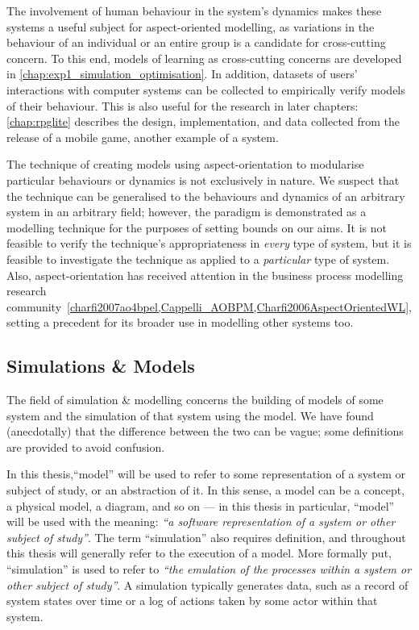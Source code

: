 The involvement of human behaviour in the system's dynamics makes these systems
a useful subject for aspect-oriented modelling, as variations in the behaviour
of an individual or an entire group is a candidate for cross-cutting concern. To
this end, models of learning as cross-cutting concerns are developed in
\cref{chap:exp1_simulation_optimisation}. In addition, datasets of users'
interactions with computer systems can be collected to empirically verify models
of their behaviour. This is also useful for the research in later chapters:
\cref{chap:rpglite} describes the design, implementation, and data collected
from the release of a mobile game, another example of a \sociotechnical system.

The technique of creating models using aspect-orientation to modularise
particular behaviours or dynamics is not exclusively \sociotechnical in nature.
We suspect that the technique can be generalised to the behaviours and dynamics
of an arbitrary system in an arbitrary field; however, the paradigm is
demonstrated as a \sociotechnical modelling technique for the purposes of
setting bounds on our aims. It is not feasible to verify the
technique's appropriateness in \emph{every} type of system, but it is feasible to
investigate the technique as applied to a \emph{particular} type of system.
Also, aspect-orientation has received attention in the business process
modelling research
community~\cref{charfi2007ao4bpel,Cappelli_AOBPM,Charfi2006AspectOrientedWL},
setting a precedent for its broader use in modelling other \sociotechnical
systems too.


\subsection{Simulations \& Models}

The field of simulation \& modelling concerns the building of models of some
system and the simulation of that system using the model. We have found
(anecdotally) that the difference between the two can be vague; some definitions
are provided to avoid confusion.

In this thesis,``model'' will be used to refer to some representation of a
system or subject of study, or an abstraction of it. In this sense, a model can
be a concept, a physical model, a diagram, and so on --- in this thesis in
particular, ``model'' will be used with the meaning: \emph{``a software
  representation of a system or other subject of study''}. The term
``simulation'' also requires definition, and throughout this thesis will
generally refer to the execution of a model. More formally put, ``simulation''
is used to refer to \emph{``the emulation of the processes within a system or
  other subject of study''}. A simulation typically generates data, such as a
record of system states over time or a log of actions taken by some actor within
that system.

